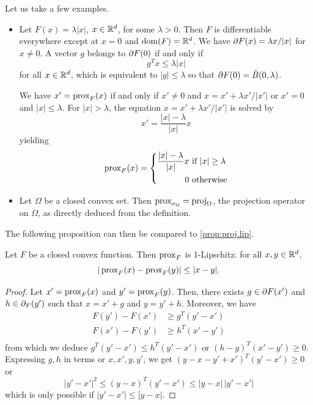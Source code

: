 Let us take a few examples.
\begin{itemize}
\item Let $F(x) = \lambda |x|$, $x\in {\mathbb{R}}^d$, for some $\lambda>0$. Then $F$ is differentiable everywhere except at $x=0$ and $\mathrm{dom}(F) = {\mathbb{R}}^d$. We have $\partial F(x) = \lambda x/|x|$ for $x\neq 0$. A vector $g$ belongs to $\partial F(0)$ if and only if
\[
g^T x \leq \lambda |x|
\]
for all $x\in {\mathbb{R}}^d$, which is equivalent to  $|g|\leq \lambda$ so that $\partial F(0) = \bar B(0, \lambda)$. 

We have $x' = \operatorname{prox}_F(x)$ if and only if $x'\neq 0$ and $x = x' + \lambda x'/|x'|$ or $x'=0$ and $|x|\leq \lambda$. For $|x| > \lambda$, the equation $x = x' + \lambda x'/|x'|$ is solved by
\[
x' = \frac{|x| - \lambda}{|x|} x
\]
yielding
\begin{equation}
\label{eq:proximal.norm}
\operatorname{prox}_F(x) = \left\{
\begin{aligned}
\frac{|x| - \lambda}{|x|} x &\text { if } |x| \geq \lambda\\
0 & \text{ otherwise}
\end{aligned}
\right.
\end{equation}

\item Let $\Omega$ be a closed convex set. Then
$\operatorname{prox}_{\sigma_\Omega} = \mathrm{proj}_\Omega$, the projection operator on $\Omega$, as directly deduced from the definition.  
\end{itemize}
The following proposition can then be compared to \cref{prop:proj.lip}.
\begin{proposition}
\label{prop:prox.lip}
Let $F$ be a closed convex function. Then $\operatorname{prox}_F$ is  1-Lipschitz: for all $x, y\in {\mathbb{R}}^d$, 
\begin{equation}
\label{eq:prox.lip}
|\operatorname{prox}_F(x) - \operatorname{prox}_F(y)| \leq |x-y|.
\end{equation}
 \end{proposition}
 \begin{proof}
 Let $x' = \operatorname{prox}_F(x)$ and $y' = \operatorname{prox}_F(y)$. Then, there exists $g\in \partial F(x')$ and $h\in \partial_F(y')$ such that $x = x' + g$ and $y = y' + h$. Moreover,  we have
 \begin{align*}
 F(y') - F(x') &\geq  g^T(y'-x')\\
 F(x') - F(y') &\geq  h^T(x'-y')\\  
 \end{align*}
 from which we deduce $g^T(y'-x') \leq h^T(y'-x')$ or $(h-g)^T(x'-y') \geq 0$. Expressing $g,h$ in terms or $x,x',y,y'$, we get
 $(y - x - y' + x')^T(y' - x') \geq 0$ or
 \[
 |y'-x'|^2 \leq (y-x)^T(y'-x') \leq |y-x|\, |y'-x'|
 \]
 which is only possible if $|y'-x'| \leq [y-x|$.
  \end{proof}

